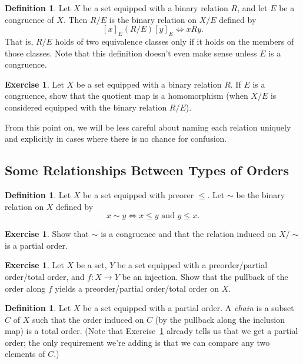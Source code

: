 \documentclass[letterpaper]{article}
\theoremstyle{definition}
\newtheorem{definition}[theorem]{Definition}
\newtheorem{exercise}[theorem]{Exercise}
\newcommand{\defterm}{\emph}
\begin{document}
\begin{definition}
  Let \(X\) be a set equipped with a binary relation \(R\), and let
  \(E\) be a congruence of \(X\).  Then \(R/E\) is the binary relation
  on \(X/E\) defined by
  \[[x]_E (R/E) [y]_E \iff xRy \text{.}\]
  That is, \(R/E\) holds of two equivalence classes only if it holds
  on the members of those classes.  Note that this definition doesn't
  even make sense unless \(E\) is a congruence.
\end{definition}

\begin{exercise}
  Let \(X\) be a set equipped with a binary relation \(R\).  If \(E\)
  is a congruence, show that the quotient map is a homomorphism (when
  \(X/E\) is considered equipped with the binary relation \(R/E\)).
\end{exercise}

From this point on, we will be less careful about naming each relation
uniquely and explicitly in cases where there is no chance for
confusion.

\subsection{Some Relationships Between Types of Orders}

\begin{definition}\label{def:preorder-equiv}
  Let \(X\) be a set equipped with preorer \(\leq\).  Let \(\sim\) be
  the binary relation on \(X\) defined by
  \[x \sim y \iff x \leq y \text{ and } y \leq x \text{.}\]
\end{definition}

\begin{exercise}\label{exercise:quotient-preorder-equiv}
  Show that \(\sim\) is a congruence and that the relation induced on
  \(X/{\sim}\) is a partial order.
\end{exercise}

\begin{exercise}\label{exercise:pullback-order-injection}
  Let \(X\) be a set, \(Y\) be a set equipped with a preorder/partial
  order/total order, and \(f:X \to Y\) be an injection.  Show that the
  pullback of the order along \(f\) yields a preorder/partial
  order/total order on \(X\).
\end{exercise}

\begin{definition}
  Let \(X\) be a set equipped with a partial order.  A \defterm{chain}
  is a subset \(C\) of \(X\) such that the order induced on \(C\) (by
  the pullback along the inclusion map) is a total order.  (Note that
  Exercise~\ref{exercise:pullback-order-injection} already tells us
  that we get a partial order; the only requirement we're adding is
  that we can compare any two elements of \(C\).)
\end{definition}
\end{document}
